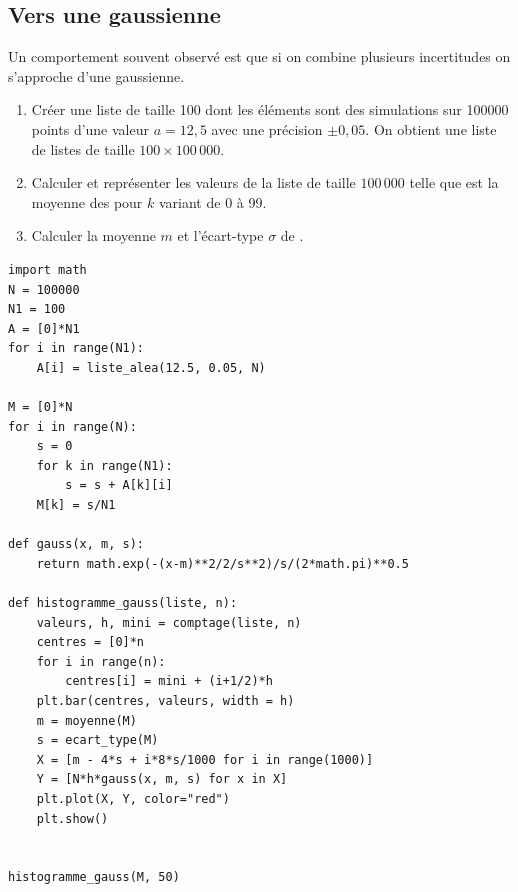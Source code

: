 \subsection{Vers une gaussienne}
Un comportement souvent observé est que si on combine plusieurs incertitudes on s'approche d'une gaussienne.
\begin{Exercise}\it 
\begin{enumerate}
    \item Créer une liste de taille 100 dont les éléments sont des simulations sur 100000 points d'une valeur $a= 12,5$ avec une précision $\pm 0,05$. On obtient une liste de listes de taille $100\times 100\,000$.
    \item Calculer et représenter les valeurs de la liste  de taille $100\,000$ telle que  est la moyenne des  pour $k$ variant de 0 à 99.
    \item Calculer la moyenne $m$ et l'écart-type $\sigma$ de .
\end{enumerate}
\end{Exercise}
\begin{Answer}
\begin{lstlisting}
import math
N = 100000
N1 = 100
A = [0]*N1
for i in range(N1):
    A[i] = liste_alea(12.5, 0.05, N)

M = [0]*N
for i in range(N):
    s = 0
    for k in range(N1):
        s = s + A[k][i]
    M[k] = s/N1

def gauss(x, m, s):
    return math.exp(-(x-m)**2/2/s**2)/s/(2*math.pi)**0.5

def histogramme_gauss(liste, n):
    valeurs, h, mini = comptage(liste, n)
    centres = [0]*n
    for i in range(n):
        centres[i] = mini + (i+1/2)*h
    plt.bar(centres, valeurs, width = h)
    m = moyenne(M)
    s = ecart_type(M)
    X = [m - 4*s + i*8*s/1000 for i in range(1000)]
    Y = [N*h*gauss(x, m, s) for x in X]
    plt.plot(X, Y, color="red")
    plt.show()


histogramme_gauss(M, 50)
\end{lstlisting}
\end{Answer}


